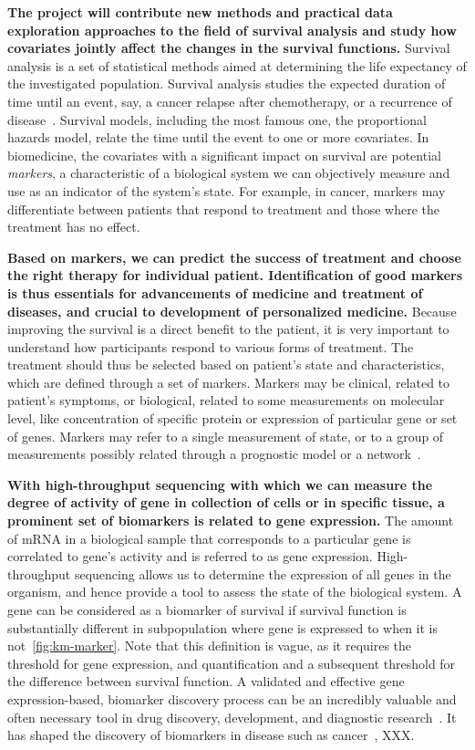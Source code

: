 \documentclass[11pt,a4paper]{article}
\renewcommand{\bold}{\textbf}
\begin{document}
\bold{The project will contribute new methods and practical data exploration approaches to the field of survival analysis and study how covariates jointly affect the changes in the survival functions.} Survival analysis is a set of statistical methods aimed at determining the life expectancy of the investigated population. Survival analysis studies the expected duration of time until an event, say, a cancer relapse after chemotherapy, or a recurrence of disease~\cite{pazdur2008endpoints}. Survival models, including the most famous one, the proportional hazards model, relate the time until the event to one or more covariates. In biomedicine, the covariates with a significant impact on survival are potential {\em markers}, a characteristic of a biological system we can objectively measure and use as an indicator of the system's state. For example, in cancer, markers may differentiate between patients that respond to treatment and those where the treatment has no effect. 

\bold{ Based on markers, we can predict the success of treatment and choose the right therapy for individual patient. Identification of good markers is thus essentials for advancements of medicine and treatment of diseases, and crucial to development of personalized medicine.} Because improving the survival is a direct benefit to the patient, it is very important to understand how participants respond to various forms of treatment. The treatment should thus be selected based on patient's state and characteristics, which are defined through a set of markers. Markers may be clinical, related to patient's symptoms, or biological, related to some measurements on molecular level, like concentration of specific protein or expression of particular gene or set of genes. Markers may refer to a single measurement of state, or to a group of measurements possibly related through a prognostic model or a network~\cite{Sonawane2019}.

\bold{ With high-throughput sequencing with which we can measure the degree of activity of gene in collection of cells or in specific tissue, a prominent set of biomarkers is related to gene expression.} The amount of mRNA in a biological sample that corresponds to a particular gene is correlated to gene's activity and is referred to as gene expression. High-throughput sequencing allows us to determine the expression of all genes in the organism, and hence provide a tool to assess the state of the biological system. A gene can be considered as a biomarker of survival if survival function is substantially different in subpopulation where gene is expressed to when it is not~\ref{fig:km-marker}. Note that this definition is vague, as it requires the threshold for gene expression, and quantification and a subsequent threshold for the difference between survival function. A validated and effective gene expression-based, biomarker discovery process can be an incredibly valuable and often necessary tool in drug discovery, development, and diagnostic research~\cite{MonforteMcPhail2005}. It has shaped the discovery of biomarkers in disease such as cancer~\cite{HENRY2012140}, XXX.
\end{document}
